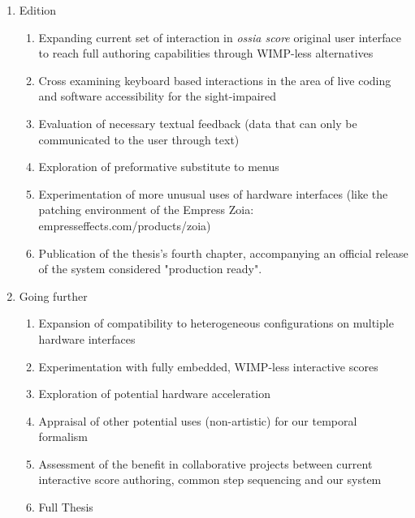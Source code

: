 \documentclass[journal,onecolumn]{IEEEtran}
\begin{document}
\begin{enumerate}
\begin{enumerate}
    \end{enumerate}
    \item Edition
    \begin{enumerate}
        \item Expanding current set of interaction in \textit{ossia score} original user interface to reach full authoring capabilities through WIMP-less alternatives
        \item Cross examining keyboard based interactions in the area of live coding and software accessibility for the sight-impaired
        \item Evaluation of necessary textual feedback (data that can only be communicated to the user through text)
        \item Exploration of preformative substitute to menus %
        \item Experimentation of more unusual uses of hardware interfaces (like the patching environment of the Empress Zoia: empresseffects.com/products/zoia)
        \item Publication of the thesis's fourth chapter, accompanying an official release of the system considered "production ready".
    \end{enumerate}
    \item Going further
    \begin{enumerate}
        \item Expansion of compatibility to heterogeneous configurations on multiple hardware interfaces
        \item Experimentation with fully embedded, WIMP-less interactive scores
        \item Exploration of potential hardware acceleration
        \item Appraisal of other potential uses (non-artistic) for our temporal formalism
        \item Assessment of the benefit in collaborative projects between current interactive score authoring, common step sequencing and our system
        \item Full Thesis
    \end{enumerate}
\end{enumerate}
\end{document}
